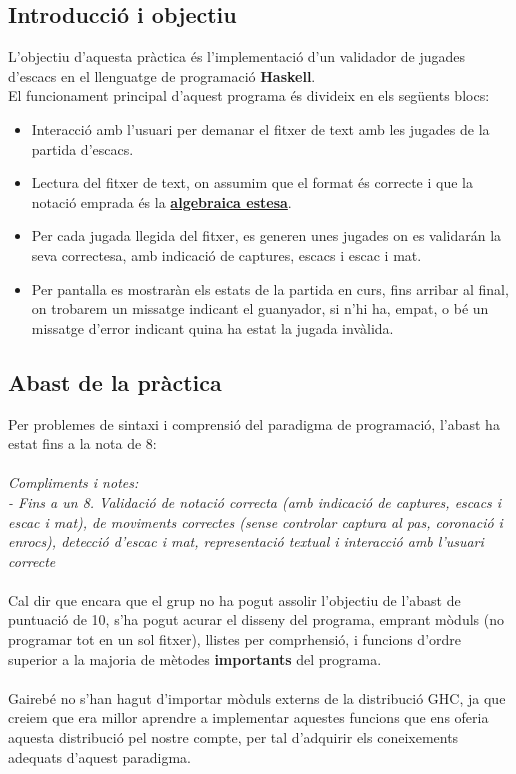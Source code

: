 \documentclass[12pt]{article}
\begin{document}
\subsection{Introducció i objectiu}
L'objectiu d'aquesta pràctica és l'implementació d'un validador de jugades d'escacs en el llenguatge de programació \textbf{Haskell}. \\
El funcionament principal d'aquest programa és divideix en els següents blocs:
\begin{itemize}
\item Interacció amb l'usuari per demanar el fitxer de text amb les jugades de la partida d'escacs. 
\item Lectura del fitxer de text, on assumim que el format és correcte i que la notació emprada és la \href{https://ca.wikipedia.org/wiki/Notaci%C3%B3_algebraica}{\textbf{algebraica estesa}}.
\item Per cada jugada llegida del fitxer, es generen unes jugades on es validarán la seva correctesa, amb indicació de captures, escacs i escac i mat.
\item Per pantalla es mostraràn els estats de la partida en curs, fins arribar al final, on trobarem un missatge indicant el guanyador, si n'hi ha, empat, o bé un missatge d'error indicant quina ha estat la jugada invàlida.
\end{itemize}

\subsection{Abast de la pràctica}

Per problemes de sintaxi i comprensió del paradigma de programació, l'abast ha estat fins a la nota de 8:
\\
\\
\noindent
\textit{Compliments i notes: \\
- Fins a un 8. Validació de notació correcta (amb indicació de captures, escacs i escac i mat), de moviments correctes (sense controlar captura al pas, coronació i enrocs), detecció d’escac i mat, representació textual i interacció amb l’usuari correcte}
\\
\\
\noindent
Cal dir que encara que el grup no ha pogut assolir l'objectiu de l'abast de puntuació de 10, s'ha pogut acurar el disseny del programa, emprant mòduls (no programar tot en un sol fitxer), llistes per comprhensió, i funcions d'ordre superior a la majoria de mètodes \textbf{importants} del programa. 
\\
\\
Gairebé no s'han hagut d'importar mòduls externs de la distribució GHC, ja que creiem que era millor aprendre a implementar aquestes funcions que ens oferia aquesta distribució pel nostre compte, per tal d'adquirir els coneixements adequats d'aquest paradigma.
\end{document}
